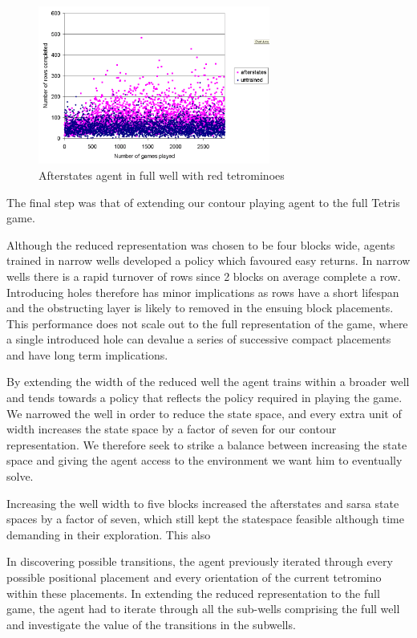 \documentclass{rucsthesis}
\begin{document}
\begin{figure}[h]
\centering
\includegraphics[width=3in]{afterstatesheightredtetfullwell.png}
\caption{Afterstates agent in full well with red tetrominoes}
\label{fig:comparemelax}
\end{figure}

The final step was that of extending our contour playing agent to the full Tetris game.

Although the reduced representation was chosen to be four blocks wide, agents trained in narrow wells developed a policy which favoured easy returns. In narrow wells there is a rapid turnover of rows since 2 blocks on average complete a row. Introducing holes therefore has minor implications as rows have a short lifespan and the obstructing layer is likely to removed in the ensuing block placements. This performance does not scale out to the full representation of the game, where a single introduced hole can devalue a series of successive compact placements and have long term implications.

By extending the width of the reduced well the agent trains within a broader well and tends towards a policy that reflects the policy required in playing the game. We narrowed the well in order to reduce the state space, and every extra unit of width increases the state space by a factor of seven for our contour representation. We therefore seek to strike a balance between increasing the state space and giving the agent access to the environment we want him to eventually solve.

Increasing the well width to five blocks increased the afterstates and sarsa state spaces by a factor of seven, which still kept the statespace feasible although time demanding in their exploration. This also 
 
In discovering possible transitions, the agent previously iterated through every possible positional placement and every orientation of the current tetromino within these placements. In extending the reduced representation to the full game, the agent had to iterate through all the sub-wells comprising the full well and investigate the value of the transitions in the subwells.
\end{document}

